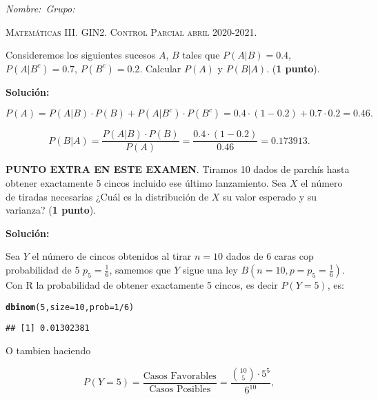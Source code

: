 \documentclass[12pt]{article}\usepackage[]{graphicx}\usepackage[]{color}
\makeatletter
\newcommand{\hlnum}[1]{\textcolor[rgb]{0.686,0.059,0.569}{#1}}%
\newcommand{\hlopt}[1]{\textcolor[rgb]{0,0,0}{#1}}%
\newcommand{\hlstd}[1]{\textcolor[rgb]{0.345,0.345,0.345}{#1}}%
\newcommand{\hlkwc}[1]{\textcolor[rgb]{0.333,0.667,0.333}{#1}}%
\newcommand{\hlkwd}[1]{\textcolor[rgb]{0.737,0.353,0.396}{\textbf{#1}}}%
\newenvironment{kframe}{%
 \def\at@end@of@kframe{}%
 \ifinner\ifhmode%
  \def\at@end@of@kframe{\end{minipage}}%
  \begin{minipage}{\columnwidth}%
 \fi\fi%
 \def\FrameCommand##1{\hskip\@totalleftmargin \hskip-\fboxsep
 \colorbox{shadecolor}{##1}\hskip-\fboxsep
     \hskip-\linewidth \hskip-\@totalleftmargin \hskip\columnwidth}%
 \MakeFramed {\advance\hsize-\width
   \@totalleftmargin\z@ \linewidth\hsize
   \@setminipage}}%
 {\par\unskip\endMakeFramed%
 \at@end@of@kframe}
\newenvironment{knitrout}{}{} %
\newcounter{problemes}
\newcounter{punts} \def\thepunts{\arabic{punts}}
\def\probl{\addtocounter{problemes}{1} \setcounter{punts}{0}
\medskip\noindent{\bf \theproblemes) }}
\makeatother
\begin{document}
\noindent\emph{Nombre:}\hfill\hfill\hfill\hfill\hfill\hfill\hfill\ \emph{Grupo:}\hfill \vspace*{-2ex}

\begin{center}
\textsc{Matemáticas III. GIN2. Control Parcial abril  2020-2021.}
\end{center}

\setcounter{problemes}{0}

\probl  Consideremos los siguientes sucesos $A$, $B$ tales que
$P(A|B)=0.4$, $P(A|B^c)=0.7$, $P(B^c)=0.2$. Calcular $P(A)$ y $P(B|A)$.
(\textbf{1 punto}).

\textbf{Solución:}




$$P(A)=P(A|B)\cdot P(B)+P(A|B^c)\cdot P(B^c)=0.4\cdot (1-0.2)+ 0.7\cdot 0.2=0.46.$$

$$P(B|A)=\frac{P(A|B)\cdot P(B)}{P(A)}=\frac{0.4\cdot (1-0.2)}{0.46}=0.173913.$$


\probl \textbf{\textsc{PUNTO EXTRA EN ESTE EXAMEN}}. Tiramos 10 dados de parchís hasta obtener exactamente 5 cincos incluido ese último lanzamiento.
Sea $X$  el número de tiradas necesarias ¿Cuál es la distribución de $X$ su valor esperado y su varianza? (\textbf{1 punto}).

\textbf{Solución:}

Sea $Y$ el número de cincos obtenidos al tirar $n=10$ dados de 6 caras cop probabilidad de 5 $p_5=\frac{1}{6}$, samemos que $Y$ sigue una ley $B(n=10,p=p_5=\frac{1}{6})$.  Con R la probabilidad de obtener exactamente 5 cincos, es decir  $P(Y=5)$, es:

\begin{knitrout}
\color{fgcolor}\begin{kframe}
\begin{alltt}
\hlkwd{dbinom}\hlstd{(}\hlnum{5}\hlstd{,}\hlkwc{size}\hlstd{=}\hlnum{10}\hlstd{,}\hlkwc{prob}\hlstd{=}\hlnum{1}\hlopt{/}\hlnum{6}\hlstd{)}
\end{alltt}
\begin{verbatim}
## [1] 0.01302381
\end{verbatim}
\end{kframe}
\end{knitrout}

O tambien haciendo 

$$P(Y=5)=\frac{\mbox{Casos Favorables}}{\mbox{Casos Posibles}}
= \frac{{10 \choose 5}\cdot 5^5}{6^{10}},$$
\end{document}
